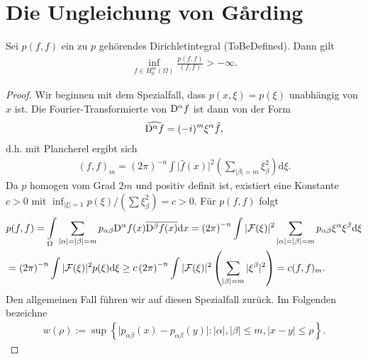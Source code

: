 \chapter{Die Ungleichung von G\r{a}rding}
\cite{Garding:1953}
\cite{Lax:1966}


\begin{thm}
Sei $p(f,f)$ ein zu $p$ gehörendes Dirichletintegral (ToBeDefined). Dann gilt 
\begin{align}
	\inf\limits_{f \in H_0^m(\Omega)} \frac{p(f,f)}{(f,f)} > -\infty.
\end{align}
\end{thm}
\begin{proof}
	Wir beginnen mit dem Spezialfall, dass $p(x,\xi) = p(\xi)$ unabhängig von $x$ ist. Die Fourier-Transformierte von $\mathrm D^\alpha f$ ist dann von der Form
	\begin{align}
		\widehat{\mathrm D^\alpha f} = (-i)^m\xi^\alpha \hat{f}, 
	\end{align}
	d.h. mit Plancherel ergibt sich
	\begin{align}
		(f,f)_m = (2\pi)^{-n}\int \vert\hat{f}(x)\vert^2 \left(\sum\limits_{\vert \beta \vert = m} \xi_\beta^2\right)\mathrm{d}\xi.
	\end{align}
	Da $p$ homogen vom Grad $2m$ und positiv definit ist, existiert eine Konstante $c>0$ mit $\inf_{\vert \xi \vert =1} p(\xi)/(\sum  \xi_\beta^2) = c >0$. Für $p(f,f)$ folgt
	\begin{align}
		\begin{split}&p(f,f) = \int\limits_\Omega \sum\limits_{\vert\alpha\vert = \vert \beta\vert =m}p_{\alpha\beta}\mathrm D^\alpha f(x)\overline{\mathrm D^\beta f(x)}\mathrm{d}x =\left(2\pi\right)^{-n}\int\vert \mathcal{F}(\xi)\vert^2\sum\limits_{\vert\alpha\vert =\vert\beta\vert = m}p_{\alpha\beta}\xi^{\alpha}\xi^\beta\mathrm{d}\xi\\
& = \left(2\pi\right)^{-n} \int \vert \mathcal{F}(\xi)\vert^2 p(\xi)\mathrm{d}\xi \ge c \left(2\pi\right)^{-n}\int\vert\mathcal{F}(\xi)\vert^2  \left(\sum\limits_{\vert \beta\vert=m} \vert\xi^\beta\vert^2\right)		= c (f,f)_m.
\end{split}
\end{align}	
Den allgemeinen Fall führen wir auf diesen Spezialfall zurück. Im Folgenden bezeichne
\begin{align}
	w(\rho):= \sup\left\{\vert p_{\alpha\beta}(x)-p_{\alpha\beta}(y)\vert : \vert\alpha\vert, \vert\beta\vert \le m, \vert x-y\vert \le \rho\right\}.
\end{align} 

\end{proof}
